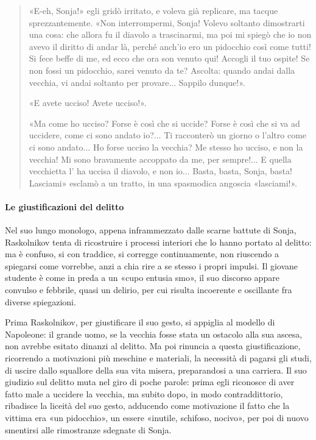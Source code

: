 \documentclass{book}
\begin{document}
\begin{quote}
«E-eh, Sonja!» egli gridò irritato, e voleva già replicare, ma tacque sprezzantemente. «Non
interrompermi, Sonja! Volevo soltanto dimostrarti una cosa: che allora fu il diavolo a
trascinarmi, ma poi mi spiegò che io non avevo il diritto di andar là, perché anch'io ero un
pidocchio così come tutti! Si fece beffe di me, ed ecco che ora son venuto qui! Accogli il tuo
ospite! Se non fossi un pidocchio, sarei venuto da te? Ascolta: quando andai dalla vecchia, vi
andai soltanto per provare... Sappilo dunque!».

«E avete ucciso! Avete ucciso!».

«Ma come ho ucciso? Forse è così che si uccide? Forse è così che si va ad uccidere, come ci
sono andato io?... Ti racconterò un giorno o l'altro come ci sono andato... Ho forse ucciso la
vecchia? Me stesso ho ucciso, e non la vecchia! Mi sono bravamente accoppato da me, per
sempre!... E quella vecchietta l' ha uccisa il diavolo, e non io... Basta, basta, Sonja, basta!
Lasciami» esclamò a un tratto, in una spasmodica angoscia «lasciami!».
\end{quote}

\paragraph{Le giustificazioni del delitto} Nel suo lungo monologo, appena inframmezzato dalle scarne battute di Sonja, Raskolnikov tenta di ricostruire i processi interiori che lo hanno portato al delitto: ma è confuso, si con traddice, si corregge continuamente, non riuscendo a spiegarsi come vorrebbe, anzi a chia rire a se stesso i propri impulsi. Il giovane studente è come in preda a un «cupo entusia smo», il suo discorso appare convulso e febbrile, quasi un delirio, per cui risulta incoerente e oscillante fra diverse spiegazioni.

Prima Raskolnikov, per giustificare il suo gesto, si appiglia al modello di Napoleone: il grande uomo, se la vecchia fosse stata un ostacolo alla sua ascesa, non avrebbe esitato dinanzi al delitto. Ma poi rinuncia a questa giustificazione, ricorrendo a motivazioni più meschine e materiali, la necessità di pagarsi gli studi, di uscire dallo squallore della sua vita misera, preparandosi a una carriera. Il suo giudizio sul delitto muta nel giro di poche parole: prima egli riconosce di aver fatto male a uccidere la vecchia, ma subito dopo, in modo contraddittorio, ribadisce la liceità del suo gesto, adducendo come motivazione il fatto che la vittima era «un pidocchio», un essere «inutile, schifoso, nocivo», per poi di
nuovo smentirsi alle rimostranze sdegnate di Sonja. 
\end{document}
